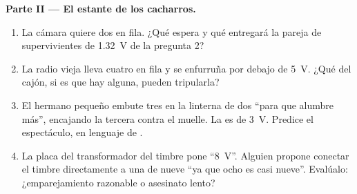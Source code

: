 \begin{problem}
\medskip\noindent\textbf{Parte II --- El estante de los cacharros.}
\begin{enumerate}[resume]
  \item La cámara quiere dos  en fila. ¿Qué 
        espera y qué entregará la pareja de supervivientes de
        \qty{1.32}{V} de la pregunta 2?
  \item La radio vieja lleva cuatro  en fila y se enfurruña por
        debajo de \qty{5}{V}. ¿Qué  del cajón, si es que hay
        alguna, pueden tripularla?
  \item El hermano pequeño embute tres  en la linterna de dos
        ``para que alumbre más'', encajando la tercera contra el
        muelle. La  es de \qty{3}{V}. Predice el
        espectáculo, en lenguaje de .
  \item La placa del transformador del timbre pone ``\qty{8}{V}''.
        Alguien propone conectar el timbre directamente a una
         de nueve  ``ya que ocho es casi
        nueve''. Evalúalo: ¿emparejamiento razonable o asesinato
        lento?
\end{enumerate}


\end{problem}
